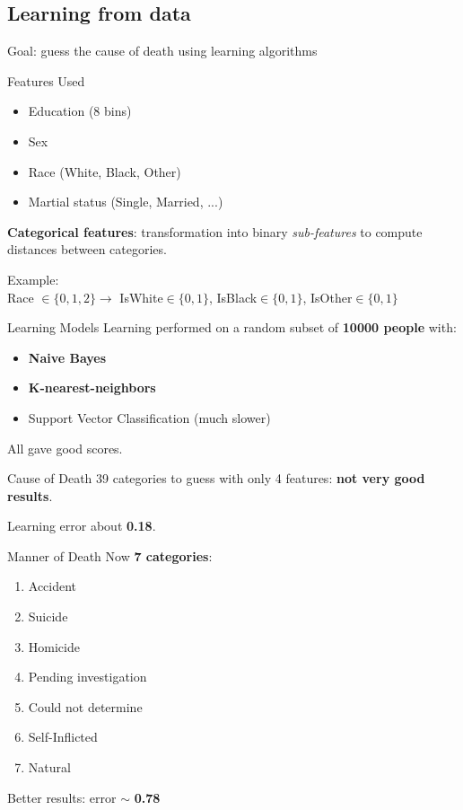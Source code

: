 \documentclass[xcolor=table]{beamer}
\begin{document}
\subsection{Learning from data}
\begin{frame}
  Goal: guess the cause of death using learning algorithms
\end{frame}

\begin{frame}{Features Used}
\begin{itemize}
  \item Education (8 bins)
  \item Sex
  \item Race (White, Black, Other)
  \item Martial status (Single, Married, ...)
\end{itemize}

\bigskip

\textbf{Categorical features}: transformation into binary \textit{sub-features} to compute distances between categories.

Example: \\
{\small Race $\in \{0,1,2\} \longrightarrow $ IsWhite$\in \{0,1\}$, IsBlack$\in \{0,1\}$, IsOther$\in \{0,1\}$}
\end{frame}


\begin{frame}{Learning Models}
  Learning performed on a random subset of \textbf{10000 people} with:
  \begin{itemize}
    \item \textbf{Naive Bayes}
    \item \textbf{K-nearest-neighbors}
    \item Support Vector Classification (much slower)
  \end{itemize}
  
  \bigskip
  
  All gave good scores.
\end{frame}


\begin{frame}{Cause of Death}
  39 categories to guess with only 4 features: \textbf{not very good results}.
  
  \bigskip
  
  Learning error about \textbf{0.18}.
\end{frame}

\begin{frame}{Manner of Death}
  Now \textbf{7 categories}:
  \begin{enumerate}
    \item Accident
    \item Suicide
    \item Homicide
    \item Pending investigation
    \item Could not determine
    \item Self-Inflicted
    \item Natural
  \end{enumerate}
  
  \bigskip
  
  Better results: error $\sim$ \textbf{0.78}
\end{frame}
\end{document}
